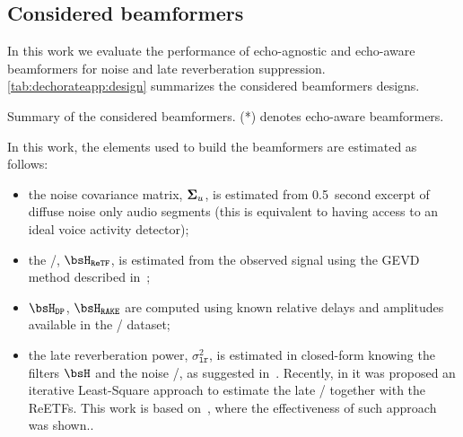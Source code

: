 \subsection{Considered beamformers}
In this work we evaluate the performance of echo-agnostic and echo-aware beamformers for noise and late reverberation suppression.
\cref{tab:dechorateapp:design} summarizes the considered beamformers designs.

\begin{table}[t]
    \begin{fullwidth}

        \centering
        \footnotesize
        
        \caption{Summary of the considered beamformers. (*) denotes echo-aware beamformers.}
        \label{tab:dechorateapp:design}

    \end{fullwidth}
\end{table}

\mynewline
In this work, the elements used to build the beamformers are estimated as follows:
\begin{itemize}
    \item the noise covariance matrix, $\boldsymbol{\Sigma}_{u} $, is estimated from 0.5~second excerpt of diffuse noise only audio segments (this is equivalent to having access to an ideal voice activity detector);
    \item the \ReTF/, $\FLTS_{\mathtt{ReTF}}$, is estimated from the observed signal using the \acf{GEVD} method described in~;
    \item $\FLTS_{\mathtt{DP}}$, $\FLTS_{\mathtt{RAKE}}$ are computed using known relative delays and amplitudes available in the \DECHORATE/ dataset;
    \item the late reverberation power, $\sigma_{\mathtt{lr}}^2$, is estimated in closed-form knowing the filters $\FLTS$ and the noise \PSD/, as suggested in~.
    Recently, in  it was proposed an iterative Least-Square approach to estimate the late \PSD/ together with the \acfp{ReETF}.
    This work is based on~, where the effectiveness of such approach was shown..
\end{itemize}


